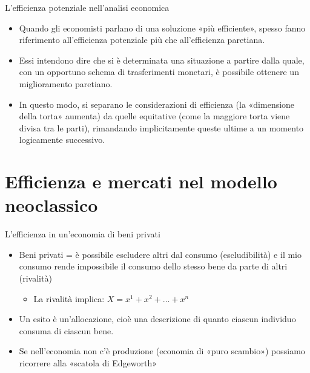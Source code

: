 \documentclass[aspectratio=64,12pt]{beamer}
\begin{document}
\begin{frame}{L'efficienza potenziale nell'analisi economica}
\begin{itemize}
\item Quando gli economisti parlano di una soluzione «più efficiente», spesso fanno riferimento all’efficienza potenziale più che all’efficienza paretiana.
\item Essi intendono dire che si è determinata una situazione a partire dalla quale, con un opportuno schema di trasferimenti monetari, è possibile ottenere un miglioramento paretiano.
\item In questo modo, si separano le considerazioni di efficienza (la «dimensione della torta» aumenta) da quelle equitative (come la maggiore torta viene divisa tra le parti), rimandando implicitamente queste ultime a un momento logicamente successivo.
\end{itemize}
\end{frame}

\section{Efficienza e mercati nel modello neoclassico}

\begin{frame}{L'efficienza in un'economia di beni privati}
\begin{itemize}
\item \alert{Beni privati} = è possibile escludere altri dal consumo (escludibilità) e il
mio consumo rende impossibile il consumo dello stesso bene da parte di altri
(rivalità)
\begin{itemize}
\item La rivalità implica: $X = x^1 + x^2 + \dots + x^n$
\end{itemize}
\item Un esito è un'\alert{allocazione}, cioè una descrizione di quanto ciascun individuo
consuma di ciascun bene.
\item Se nell’economia non c’è produzione (economia di «puro scambio») possiamo
ricorrere alla «scatola di Edgeworth»
\end{itemize}
\end{frame}
\end{document}
